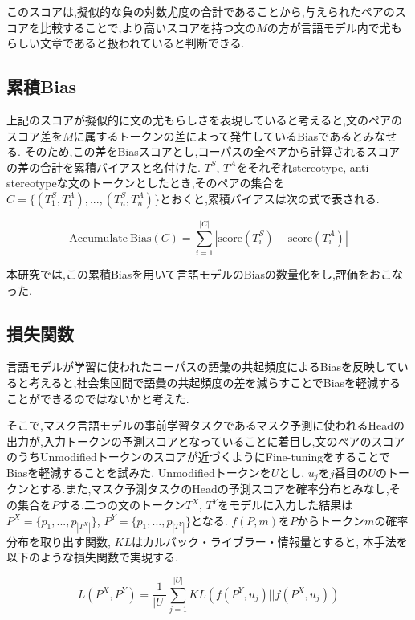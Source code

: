 \documentclass[
  platex, dvipdfmx %
]{nlp2021}
\begin{document}
このスコアは,擬似的な負の対数尤度の合計であることから,与えられたペアのスコアを比較することで,より高いスコアを持つ文の$M$の方が言語モデル内で尤もらしい文章であると扱われていると判断できる.

\subsection{累積Bias}
上記のスコアが擬似的に文の尤もらしさを表現していると考えると,文のペアのスコア差を$M$に属するトークンの差によって発生しているBiasであるとみなせる.
そのため,この差をBiasスコアとし,コーパスの全ペアから計算されるスコアの差の合計を累積バイアスと名付けた.
$T^S$, $T^A$をそれぞれstereotype, anti-stereotypeな文のトークンとしたとき,そのペアの集合を$C = \{(T_1^S, T_1^A), ... , (T_n^S, T_n^A)\}$とおくと,累積バイアスは次の式で表される.

\begin{equation}
\mathrm{Accumulate\ Bias}(C) = \sum_{i=1}^{|C|}|\mathrm{score}(T_i^S) - \mathrm{score}(T_i^A)|
\label{eq:bias_score}
\end{equation}

本研究では,この累積Biasを用いて言語モデルのBiasの数量化をし,評価をおこなった.

\subsection{損失関数}
言語モデルが学習に使われたコーパスの語彙の共起頻度によるBiasを反映していると考えると,社会集団間で語彙の共起頻度の差を減らすことでBiasを軽減することができるのではないかと考えた.

そこで,マスク言語モデルの事前学習タスクであるマスク予測に使われるHeadの出力が,入力トークンの予測スコアとなっていることに着目し,文のペアのスコアのうちUnmodifiedトークンのスコアが近づくようにFine-tuningをすることでBiasを軽減することを試みた.
Unmodifiedトークンを$U$とし, $u_j$を$j$番目の$U$のトークンとする.また,マスク予測タスクのHeadの予測スコアを確率分布とみなし,その集合を$P$する.二つの文のトークン$T^X$, $T^Y$をモデルに入力した結果は$P^X = \{p_1, ..., p_{|T^X|}\}$, $P^Y = \{p_1, ..., p_{|T^Y|}\}$となる. $f(P, m)$を$P$からトークン$m$の確率分布を取り出す関数, $KL$はカルバック・ライブラー・情報量とすると, 本手法を以下のような損失関数で実現する.

\begin{equation}
\label{eq:loss_function}
L(P^X, P^Y) = \frac{1}{|U|}\sum_{j=1}^{|U|}{KL(f(P^Y, u_j) || f(P^X, u_j))}
\end{equation}
\end{document}
